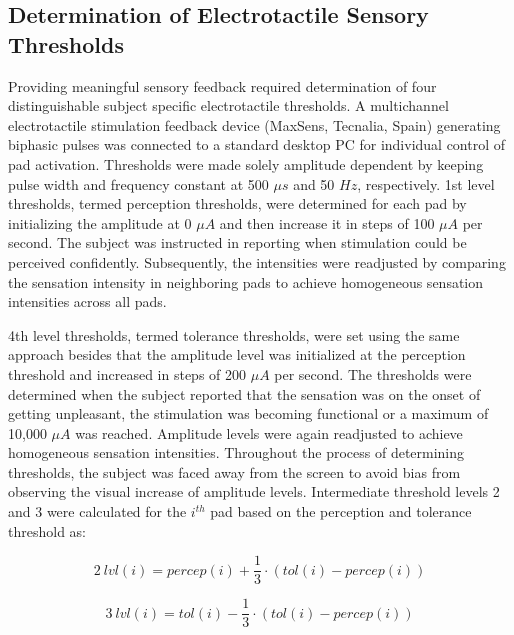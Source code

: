 
\subsection{Determination of Electrotactile Sensory Thresholds}


Providing meaningful sensory feedback required determination of four distinguishable subject specific electrotactile thresholds. A multichannel electrotactile stimulation feedback device (MaxSens, Tecnalia, Spain) generating biphasic pulses was connected to a standard desktop PC for individual control of pad activation. Thresholds were made solely amplitude dependent by keeping pulse width and frequency constant at 500 $\mu s$ and 50 $Hz$, respectively.  1st level thresholds, termed perception thresholds, were determined for each pad by initializing the amplitude at 0 $\mu A$ and then increase it in steps of 100 $\mu A$ per second. The subject was instructed in reporting when stimulation could be perceived confidently. Subsequently, the intensities were readjusted by comparing the sensation intensity in neighboring pads to achieve homogeneous sensation intensities across all pads. 

4th level thresholds, termed tolerance thresholds, were set using the same approach besides that the amplitude level was initialized at the perception threshold and increased in steps of 200 $\mu A$ per second. The thresholds were determined when the subject reported that the sensation was on the onset of getting unpleasant, the stimulation was becoming functional or a maximum of 10,000 $\mu A$ was reached. Amplitude levels were again readjusted to achieve homogeneous sensation intensities. Throughout the process of determining thresholds, the subject was faced away from the screen to avoid bias from observing the visual increase of amplitude levels. Intermediate threshold levels 2 and 3 were calculated for the $i^{th}$ pad based on the perception and tolerance threshold as: 

	\begin{equation}
	2~lvl(i) = percep(i) + \frac{1}{3} \cdot (tol(i) - percep(i))
	\end{equation}

	\begin{equation}
	3~lvl(i) = tol(i) - \frac{1}{3} \cdot (tol(i) - percep(i))
	\end{equation}
